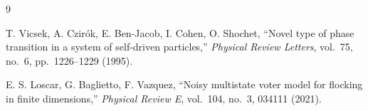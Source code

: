 \documentclass[11pt,a4paper]{article}
\begin{document}
\begin{thebibliography}{9}

T. Vicsek, A. Czirók, E. Ben-Jacob, I. Cohen, O. Shochet,
``Novel type of phase transition in a system of self-driven particles,''
\emph{Physical Review Letters}, vol.\ 75, no.\ 6, pp.\ 1226--1229 (1995).

E. S. Loscar, G. Baglietto, F. Vazquez,
``Noisy multistate voter model for flocking in finite dimensions,''
\emph{Physical Review E}, vol.\ 104, no.\ 3, 034111 (2021).

\end{thebibliography}
\end{document}
